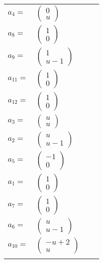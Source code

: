 \documentclass[1p]{elsarticle_modified}
\theoremstyle{definition}
\begin{document}
\begin{tabular}{m{7pt} m{180pt} m{7pt} m{180pt} }
\flushright $a_{4}=$&$\begin{pmatrix}0\\u\end{pmatrix}$ \\
\flushright $a_{8}=$&$\begin{pmatrix}1\\0\end{pmatrix}$ \\
\flushright $a_{9}=$&$\begin{pmatrix}1\\u-1\end{pmatrix}$ \\
\flushright $a_{11}=$&$\begin{pmatrix}1\\0\end{pmatrix}$ \\
\flushright $a_{12}=$&$\begin{pmatrix}1\\0\end{pmatrix}$ \\
\flushright $a_{3}=$&$\begin{pmatrix}u\\u\end{pmatrix}$ \\
\flushright $a_{2}=$&$\begin{pmatrix}u\\u-1\end{pmatrix}$ \\
\flushright $a_{5}=$&$\begin{pmatrix}-1\\0\end{pmatrix}$ \\
\flushright $a_{1}=$&$\begin{pmatrix}1\\0\end{pmatrix}$ \\
\flushright $a_{7}=$&$\begin{pmatrix}1\\0\end{pmatrix}$ \\
\flushright $a_{6}=$&$\begin{pmatrix}u\\u-1\end{pmatrix}$ \\
\flushright $a_{10}=$&$\begin{pmatrix}- u+2\\u\end{pmatrix}$\\&\end{tabular}
\end{document}
